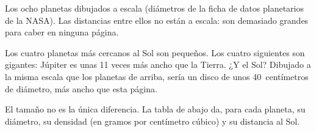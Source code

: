 \begin{omfigure}
\gsixsizes
{}

{\small Los ocho planetas dibujados a escala (diámetros de la ficha de
datos planetarios de la NASA). Las distancias entre ellos no están a
escala: son demasiado grandes para caber en ninguna página.}
\end{omfigure}

Los cuatro planetas más cercanos al Sol son pequeños. Los cuatro siguientes
son gigantes: Júpiter es unas 11 veces más ancho que la Tierra. ¿Y el Sol?
Dibujado a la misma escala que los planetas de arriba, sería un disco de
unos 40~centímetros de diámetro, más ancho que esta página.

El tamaño no es la única diferencia. La tabla de abajo da, para cada
planeta, su diámetro, su densidad (en gramos por centímetro cúbico) y su
distancia al Sol.

